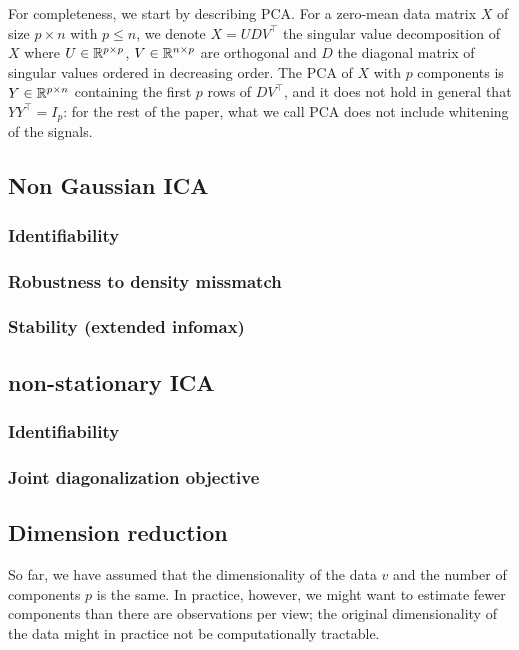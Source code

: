 For completeness, we start by describing PCA. For a zero-mean data matrix $X$ of size $p\times n$ with $p \leq n$, we denote $X= UD V^{\top}$ the singular value decomposition of $X$ where $U \in \mathbb{R}^{p\times p}$, $V \in \mathbb{R}^{n \times p}$ are orthogonal and $D$ the diagonal matrix of singular values ordered in decreasing order.
% 
The PCA of $X$ with $p$ components is $Y\in\mathbb{R}^{p\times n}$ containing the first $p$ rows of $DV^{\top}$, and it does not hold in general that $YY^{\top}=I_p$: for the rest of the paper, what we call PCA does not include whitening of the signals.


\subsection{Non Gaussian ICA}
\subsubsection{Identifiability}
\subsubsection{Robustness to density missmatch}
\subsubsection{Stability (extended infomax)}
\subsection{non-stationary ICA}
\subsubsection{Identifiability}
\subsubsection{Joint diagonalization objective}
\subsection{Dimension reduction}
So far, we have assumed that the dimensionality of the data $v$ and the number
of components $p$ is the same. 
In practice, however, we might want to estimate fewer components than there are observations per view; the original dimensionality of the data %
might in practice not be computationally tractable.


